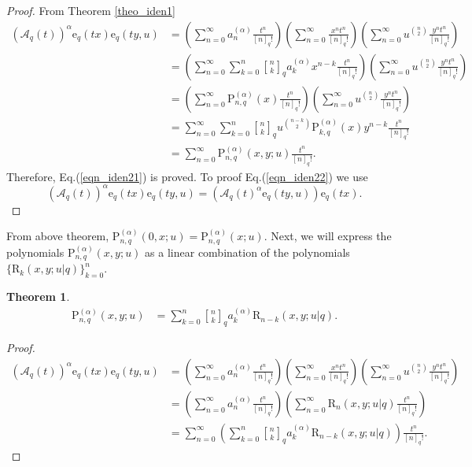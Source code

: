 \documentclass[12pt]{article}
\newcommand{\qbinom}{\genfrac{[}{]}{0pt}{}}
\newcommand{\e}{\mathrm{e}}
\newcommand{\A}{\mathcal{A}}
\newcommand{\p}{\mathrm{P}}
\newcommand{\rr}{\mathrm{R}}
\newtheorem{theorem}{Theorem}
\begin{document}
\begin{proof}
From Theorem \ref{theo_iden1}
    \begin{align*}
        (\A_{q}(t))^{\alpha}\e_{q}(tx)\e_{q}(ty,u)&=\left(\sum_{n=0}^{\infty}a_{n}^{(\alpha)}\frac{t^n}{[n]_{q}!}\right)\left(\sum_{n=0}^{\infty}\frac{x^nt^n}{[n]_{q}!}\right)\left(\sum_{n=0}^{\infty}u^{\binom{n}{2}}\frac{y^nt^n}{[n]_{q}!}\right)\\
        &=\left(\sum_{n=0}^{\infty}\sum_{k=0}^{n}\qbinom{n}{k}_{q}a_{k}^{(\alpha)}x^{n-k}\frac{t^n}{[n]_{q}!}\right)\left(\sum_{n=0}^{\infty}u^{\binom{n}{2}}\frac{y^nt^n}{[n]_{q}!}\right)\\
        &=\left(\sum_{n=0}^{\infty}\p_{n,q}^{(\alpha)}(x)\frac{t^n}{[n]_{q}!}\right)\left(\sum_{n=0}^{\infty}u^{\binom{n}{2}}\frac{y^nt^n}{[n]_{q}!}\right)\\
        &=\sum_{n=0}^{\infty}\sum_{k=0}^{n}\qbinom{n}{k}_{q}u^{\binom{n-k}{2}}\p_{k,q}^{(\alpha)}(x)y^{n-k}\frac{t^n}{[n]_{q}!}\\
        &=\sum_{n=0}^{\infty}\p_{n,q}^{(\alpha)}(x,y;u)\frac{t^n}{[n]_{q}!}.
    \end{align*}
Therefore, Eq.(\ref{eqn_iden21}) is proved. To proof Eq.(\ref{eqn_iden22}) we use
\begin{equation*}
    (\A_{q}(t))^{\alpha}\e_{q}(tx)\e_{q}(ty,u)=(\A_{q}(t)^{\alpha}\e_{q}(ty,u))\e_{q}(tx).
\end{equation*}
\end{proof}
From above theorem, $\p_{n,q}^{(\alpha)}(0,x;u)=\p_{n,q}^{(\alpha)}(x;u)$. Next, we will express the polynomials $\p_{n,q}^{(\alpha)}(x,y;u)$ as a linear combination of the polynomials $\{\rr_{k}(x,y;u|q)\}_{k=0}^{n}$.
\begin{theorem}\label{theo_iden3}
    \begin{align}
        \p_{n,q}^{(\alpha)}(x,y;u)&=\sum_{k=0}^{n}\qbinom{n}{k}_{q}a_{k}^{(\alpha)}\rr_{n-k}(x,y;u|q).
    \end{align}
\end{theorem}
\begin{proof}
\begin{align*}
    (\A_{q}(t))^{\alpha}\e_{q}(tx)\e_{q}(ty,u)&=\left(\sum_{n=0}^{\infty}a_{n}^{(\alpha)}\frac{t^n}{[n]_{q}!}\right)\left(\sum_{n=0}^{\infty}\frac{x^nt^n}{[n]_{q}!}\right)\left(\sum_{n=0}^{\infty}u^{\binom{n}{2}}\frac{y^nt^n}{[n]_{q}!}\right)\\
    &=\left(\sum_{n=0}^{\infty}a_{n}^{(\alpha)}\frac{t^n}{[n]_{q}!}\right)\left(\sum_{n=0}^{\infty}\rr_{n}(x,y;u|q)\frac{t^n}{[n]_{q}!}\right)\\
    &=\sum_{n=0}^{\infty}\left(\sum_{k=0}^{n}\qbinom{n}{k}_{q}a_{k}^{(\alpha)}\rr_{n-k}(x,y;u|q)\right)\frac{t^n}{[n]_{q}!}.
\end{align*}    
\end{proof}
\end{document}
